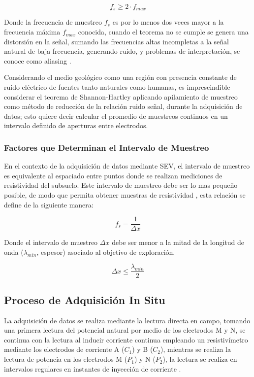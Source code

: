 			\begin{equation}
				f_{s} \geq 2 \cdot f_{max}
			\end{equation}
			
			Donde la frecuencia de muestreo $f_{s}$ es por lo menos dos veces mayor a la frecuencia máxima $f_{max}$ conocida, cuando el teorema no se cumple se genera una distorsión en la señal, sumando las frecuencias altas incompletas a la señal natural de baja frecuencia, generando ruido, y problemas de interpretación, se conoce como aliasing \citep{alvarado2010}. 
			
			Considerando el medio geológico como una región con presencia constante de ruido eléctrico de fuentes tanto naturales como humanas, es imprescindible considerar el teorema de Shannon-Hartley aplicando apilamiento de muestreo como método de reducción de la relación ruido señal, durante la adquisición de datos; esto quiere decir calcular el promedio de muestreos continuos en un intervalo definido de aperturas entre electrodos.
			
				
			\subsubsection{Factores que Determinan el Intervalo de Muestreo}
		
				En el contexto de la adquisición de datos mediante SEV, el intervalo de muestreo es equivalente al espaciado entre puntos donde se realizan mediciones de resistividad del subsuelo. Este intervalo de muestreo debe ser lo mas pequeño posible, de modo que permita obtener muestras de resistividad \citep{telford1990}, esta relación se define de la siguiente manera:
				
				\begin{equation}
					f_{s}= \frac{1}{\Delta x}
				\end{equation}
				
				Donde el intervalo de muestreo $\Delta x$ debe ser menor a la mitad de la longitud de onda ($\lambda_{min}$, espesor) asociado al objetivo de exploración.
				
				\begin{equation}
					\Delta x \leq \frac{\lambda_{min} }{2}
				\end{equation}
				
				
			
		\subsection{Proceso de Adquisición In Situ}
			La adquisición de datos se realiza mediante la lectura directa en campo, tomando una primera lectura del potencial natural por medio de los electrodos M y N, se continua con la lectura al inducir corriente continua empleando un resistivímetro mediante los electrodos de corriente A ($C_{1}$) y B ($C_{2}$), mientras se realiza la lectura de potencia en los electrodos M ($P_{1}$) y N ($P_{2}$), la lectura se realiza en intervalos regulares en instantes de inyección de corriente \citep{telford1990}.
			
